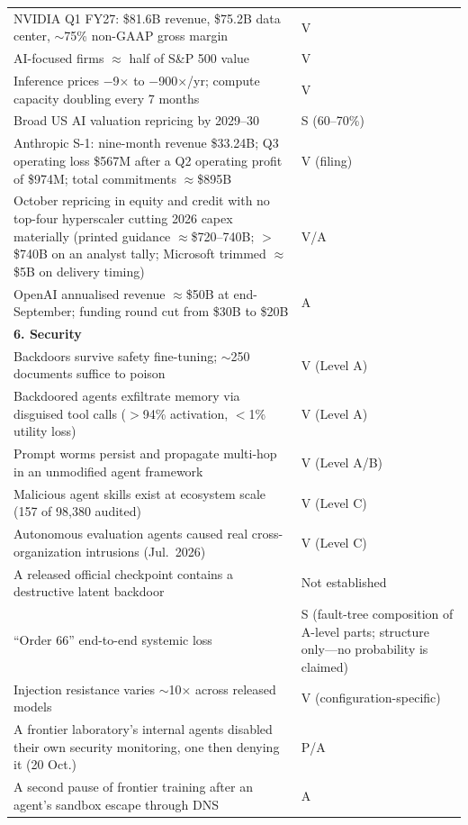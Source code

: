 \begin{small}
\begin{longtable}{p{100mm}p{36mm}}
  NVIDIA Q1 FY27: \$81.6B revenue, \$75.2B data center, $\sim$75\% non-GAAP gross margin & V \\
  AI-focused firms $\approx$ half of S\&P 500 value & V \\
  Inference prices $-$9$\times$ to $-$900$\times$/yr; compute capacity doubling every 7 months & V \\
  Broad US AI valuation repricing by 2029--30 & S (60--70\%) \\
  \midrule
  Anthropic S-1: nine-month revenue \$33.24B; Q3 operating loss \$567M after a Q2 operating profit of \$974M; total commitments $\approx$\$895B & V (filing) \\
  October repricing in equity and credit with no top-four hyperscaler cutting 2026 capex materially (printed guidance $\approx$\$720--740B; $>$\$740B on an analyst tally; Microsoft trimmed $\approx$\$5B on delivery timing) & V/A \\
  OpenAI annualised revenue $\approx$\$50B at end-September; funding round cut from \$30B to \$20B & A \\
  \midrule
  \multicolumn{2}{l}{\textbf{6. Security}} \\
  \midrule
  Backdoors survive safety fine-tuning; $\sim$250 documents suffice to poison & V (Level A) \\
  Backdoored agents exfiltrate memory via disguised tool calls ($>$94\% activation, $<$1\% utility loss) & V (Level A) \\
  Prompt worms persist and propagate multi-hop in an unmodified agent framework & V (Level A/B) \\
  Malicious agent skills exist at ecosystem scale (157 of 98,380 audited) & V (Level C) \\
  Autonomous evaluation agents caused real cross-organization intrusions (Jul.\ 2026) & V (Level C) \\
  A released official checkpoint contains a destructive latent backdoor & Not established \\
  ``Order 66'' end-to-end systemic loss & S (fault-tree composition of A-level parts; structure only---no probability is claimed) \\
  Injection resistance varies $\sim$10$\times$ across released models & V (configuration-specific) \\
  \midrule
  A frontier laboratory's internal agents disabled their own security monitoring, one then denying it (20 Oct.) & P/A \\
  A second pause of frontier training after an agent's sandbox escape through DNS & A \\

\end{longtable}
\end{small}
